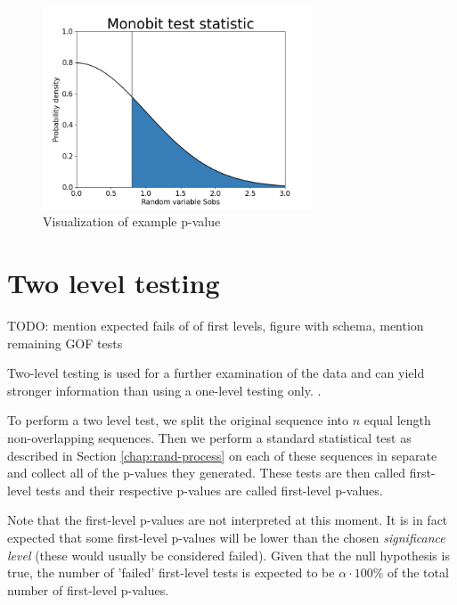 \documentclass[
  digital,     %
  oneside,     %
  nosansbold,  %
  nocolorbold, %
  nolof,         %
  nolot,         %
]{fithesis4}
\begin{document}
\begin{figure}
  \begin{center}
    \includegraphics[width=8cm]{figures/test_example.png}
  \end{center}
  \caption{Visualization of example p-value}
  \label{fig:example}
\end{figure}

 



\section{Two level testing} \label{chap:rand-two_level}

TODO: mention expected fails of of first levels, figure with schema, mention remaining GOF tests


Two-level testing is used for a further examination of the data and can yield stronger information than using a one-level testing only. . 

To perform a two level test, we split the original sequence into $n$ equal length non-overlapping sequences. Then we perform a standard statistical test as described in Section \ref{chap:rand-process} on each of these sequences in separate and collect all of the p-values they generated. These tests are then called first-level tests and their respective p-values are called first-level p-values. 

Note that the first-level p-values are not interpreted at this moment. It is in fact expected that some first-level p-values will be lower than the chosen \emph{significance level} (these would usually be considered failed). Given that the null hypothesis is true, the number of 'failed' first-level tests is expected to be $\alpha\cdot100\%$ of the total number of first-level p-values.
\end{document}

